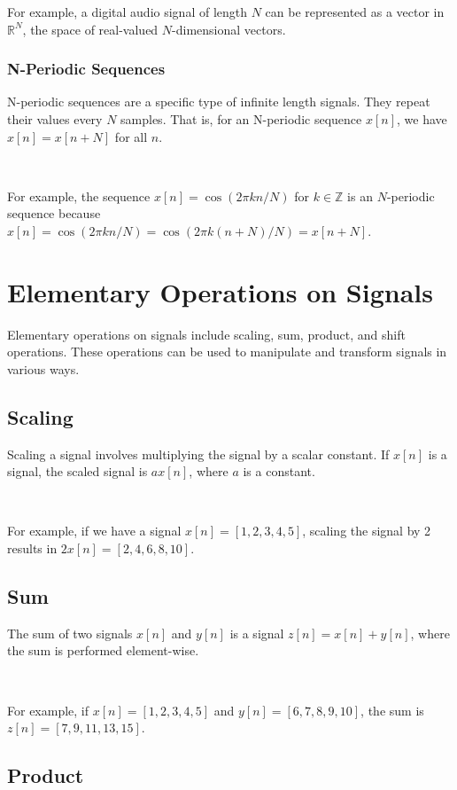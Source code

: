 \documentclass[11pt]{article}
\begin{document}
For example, a digital audio signal of length $N$ can be represented as a vector in $\mathbb{R}^N$, the space of real-valued $N$-dimensional vectors.

\subsubsection*{N-Periodic Sequences}

N-periodic sequences are a specific type of infinite length signals. They repeat their values every $N$ samples. That is, for an N-periodic sequence $x[n]$, we have $x[n] = x[n+N]$ for all $n$.

\ 


For example, the sequence $x[n] = \cos(2\pi k n/N)$ for $k \in \mathbb{Z}$ is an $N$-periodic sequence because $x[n] = \cos(2\pi k n/N) = \cos(2\pi k (n+N)/N) = x[n+N]$.

\section*{Elementary Operations on Signals}

Elementary operations on signals include scaling, sum, product, and shift operations. These operations can be used to manipulate and transform signals in various ways.

\subsection*{Scaling}

Scaling a signal involves multiplying the signal by a scalar constant. If $x[n]$ is a signal, the scaled signal is $a x[n]$, where $a$ is a constant.

\ 


For example, if we have a signal $x[n] = [1, 2, 3, 4, 5]$, scaling the signal by 2 results in $2x[n] = [2, 4, 6, 8, 10]$.

\subsection*{Sum}

The sum of two signals $x[n]$ and $y[n]$ is a signal $z[n] = x[n] + y[n]$, where the sum is performed element-wise.

\ 


For example, if $x[n] = [1, 2, 3, 4, 5]$ and $y[n] = [6, 7, 8, 9, 10]$, the sum is $z[n] = [7, 9, 11, 13, 15]$.

\subsection*{Product}
\end{document}
